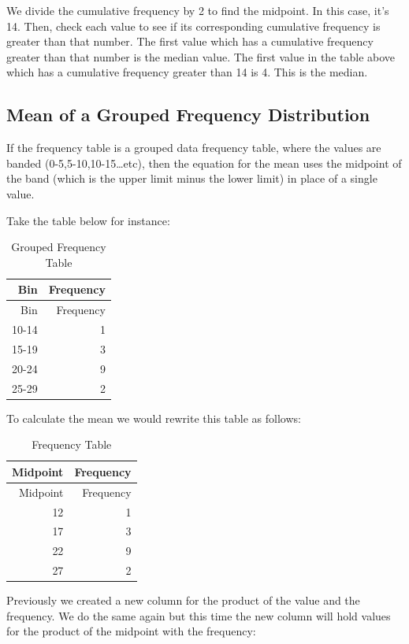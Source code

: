 \documentclass[
]{book}
\begin{document}
We divide the cumulative frequency by 2 to find the midpoint. In this case, it's 14. Then, check each value to see if its corresponding cumulative frequency is greater than that number. The first value which has a cumulative frequency greater than that number is the median value. The first value in the table above which has a cumulative frequency greater than 14 is 4. This is the median.

\hypertarget{mean-of-a-grouped-frequency-distribution}{%
\subsection{Mean of a Grouped Frequency Distribution}\label{mean-of-a-grouped-frequency-distribution}}

If the frequency table is a grouped data frequency table, where the values are banded (0-5,5-10,10-15\ldots etc), then the equation for the mean uses the midpoint of the band (which is the upper limit minus the lower limit) in place of a single value.

Take the table below for instance:

\begin{longtable}[]{@{}rr@{}}
\caption{\label{tab:table0007} Grouped Frequency Table}\tabularnewline
\toprule
Bin & Frequency \\
\midrule
\endfirsthead
\toprule
Bin & Frequency \\
\midrule
\endhead
10-14 & 1 \\
15-19 & 3 \\
20-24 & 9 \\
25-29 & 2 \\
\bottomrule
\end{longtable}

To calculate the mean we would rewrite this table as follows:

\begin{longtable}[]{@{}rr@{}}
\caption{\label{tab:table00007} Frequency Table}\tabularnewline
\toprule
Midpoint & Frequency \\
\midrule
\endfirsthead
\toprule
Midpoint & Frequency \\
\midrule
\endhead
12 & 1 \\
17 & 3 \\
22 & 9 \\
27 & 2 \\
\bottomrule
\end{longtable}

Previously we created a new column for the product of the value and the frequency. We do the same again but this time the new column will hold values for the product of the midpoint with the frequency:
\end{document}
